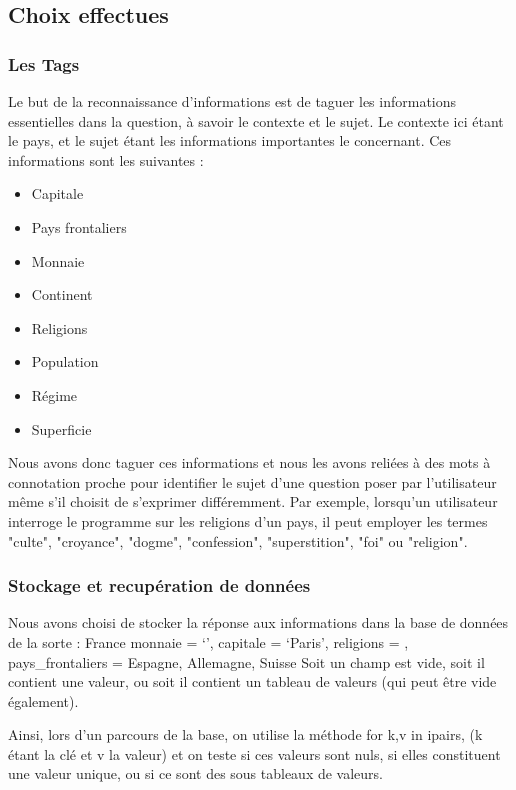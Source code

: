 \documentclass[11pt,a4paper]{article}
\begin{document}
\subsection{Choix effectues}

\subsubsection{Les Tags} 

Le but de la reconnaissance d’informations est de taguer les informations essentielles dans la question, à savoir le contexte et le sujet. Le contexte ici étant le pays, et le sujet étant les informations importantes le concernant. Ces informations sont les suivantes :
\begin{itemize}
	\item Capitale
	\item Pays frontaliers
	\item Monnaie
	\item Continent
	\item Religions
	\item Population
	\item Régime
	\item Superficie
\end{itemize}

Nous avons donc taguer ces informations et nous les avons reliées à des mots à connotation proche pour identifier le sujet d'une question poser par l'utilisateur même s'il choisit de s'exprimer différemment. Par exemple, lorsqu'un utilisateur interroge le programme sur les religions d'un pays, il peut employer les termes "culte", "croyance", "dogme", "confession", "superstition", "foi" ou "religion".

\subsubsection{Stockage et recupération de données}

Nous avons choisi de stocker la réponse aux informations dans la base de données de la sorte :
France {
	monnaie = ‘’,
	capitale = ‘Paris’,
	religions = {},
	pays\_frontaliers = { Espagne, Allemagne, Suisse }
}
Soit un champ est vide, soit il contient une valeur, ou soit il contient un tableau de valeurs (qui peut être vide également). 

Ainsi, lors d'un parcours de la base, on utilise la méthode for k,v in ipairs, (k étant la clé et v la valeur) et on teste si ces valeurs sont nuls, si elles constituent une valeur unique, ou si ce sont des sous tableaux de valeurs. 
\end{document}

